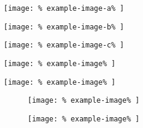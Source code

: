 \documentclass{article}
\let\vamaxheight\relax
\newlength{%
		\vamaxheight%
	}%
\begin{document}
\begin{verticallyaligned}
	\noindent
	\begin{minipage}[b][\vamaxheight][b]{%
			.30\textwidth%
		}
		\centering
		\texttt{[image: \%
			example-image-a\%
		]}%
	\end{minipage}
	\hfill
	\begin{minipage}[b][\vamaxheight][t]{%
			.10\textwidth%
		}
		\centering
		\texttt{[image: \%
			example-image-b\%
		]}%
	\end{minipage}
	\hfill
	\begin{minipage}[b][\vamaxheight][t]{%
			.20\textwidth%
		}
		\centering
		\texttt{[image: \%
			example-image-c\%
		]}%
	\end{minipage}
	\hfill
	\begin{minipage}[b][\vamaxheight][c]{%
			.20\textwidth%
		}
		\centering
		\texttt{[image: \%
			example-image\%
		]}%
	\end{minipage}
	\hfill
	\begin{minipage}[b][\vamaxheight][t]{%
			.20\textwidth%
		}
		\centering
		\texttt{[image: \%
			example-image\%
		]}%
	\end{minipage}
\end{verticallyaligned}

\lipsum[1]

\begin{figure}
	\begin{verticallyaligned}
		\noindent
		\begin{minipage}[b][\vamaxheight][c]{%
				.50\textwidth%
			}
			\centering
			\texttt{[image: \%
				example-image\%
			]}%
			\caption{%
			}%
		\end{minipage}
		\hfill
		\begin{minipage}[b][\vamaxheight][t]{%
				.40\textwidth%
			}
			\centering
			\texttt{[image: \%
				example-image\%
			]}%
			\caption{%
			}%
		\end{minipage}
	\end{verticallyaligned}
	\caption{%
	}%
\end{figure}
\end{document}
